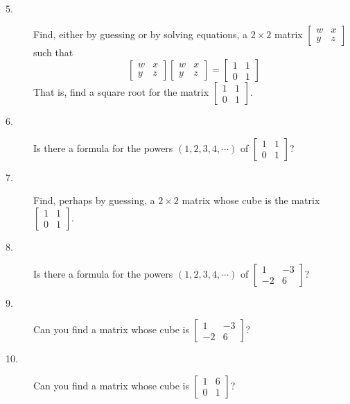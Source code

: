 \documentclass{article}
\begin{document}
\begin{description}
  \item[5.] Find, either by guessing or by solving equations, a $2 \times 2$ matrix $\begin{bmatrix} w & x \\ y & z \end{bmatrix}$ such that 
    \begin{equation*}
    \begin{bmatrix} w & x \\ y & z \end{bmatrix}  \begin{bmatrix} w & x \\ y & z \end{bmatrix}  =  \begin{bmatrix} 1 & 1 \\ 0 & 1 \end{bmatrix}
    \end{equation*}
    That is, find a square root for the matrix $\begin{bmatrix} 1 & 1 \\ 0 & 1 \end{bmatrix}$.

  \item[6.] Is there a formula for the powers $(1, 2, 3, 4, \cdots)$ of $\begin{bmatrix} 1 & 1 \\ 0 & 1 \end{bmatrix}$? 

  \item[7.] Find, perhaps by guessing, a $2 \times 2$ matrix whose cube is the matrix $\begin{bmatrix} 1 & 1 \\ 0 & 1 \end{bmatrix}$. 

  \item[8.] Is there a formula for the powers $(1, 2, 3, 4, \cdots)$ of $\begin{bmatrix} 1 & -3 \\ -2 & 6 \end{bmatrix}$?

  \item[9.] Can you find a matrix whose cube is $\begin{bmatrix} 1 & -3 \\ -2 & 6 \end{bmatrix}$? 

  \item[10.] Can you find a matrix whose cube is $\begin{bmatrix} 1 & 6 \\ 0 & 1 \end{bmatrix}$? 


\end{description}
\end{document}
